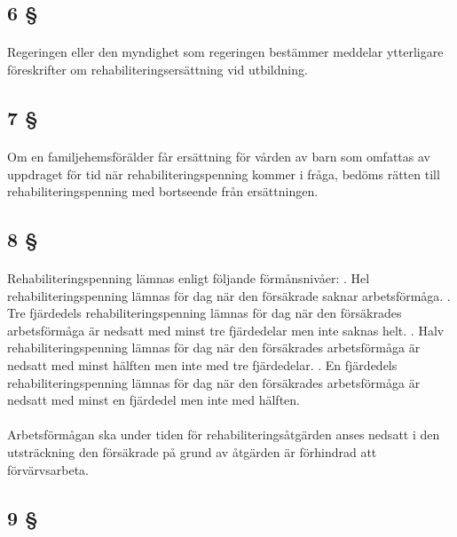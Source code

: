 \documentclass[a4paper,notitlepage,openany,10pt]{book}
\begin{document}
\subsection*{6 §}
\paragraph*{}
Regeringen eller den myndighet som regeringen bestämmer meddelar ytterligare föreskrifter om rehabiliteringsersättning vid utbildning.
\subsection*{7 §}
\paragraph*{}
Om en familjehemsförälder får ersättning för vården av barn som omfattas av uppdraget för tid när rehabiliteringspenning kommer i fråga, bedöms rätten till rehabiliteringspenning med bortseende från ersättningen.
\subsection*{8 §}
\paragraph*{}
Rehabiliteringspenning lämnas enligt följande förmånsnivåer:
. Hel rehabiliteringspenning lämnas för dag när den försäkrade saknar arbetsförmåga.
. Tre fjärdedels rehabiliteringspenning lämnas för dag när den försäkrades arbetsförmåga är nedsatt med minst tre fjärdedelar men inte saknas helt.
. Halv rehabiliteringspenning lämnas för dag när den försäkrades arbetsförmåga är nedsatt med minst hälften men inte med tre fjärdedelar.
. En fjärdedels rehabiliteringspenning lämnas för dag när den försäkrades arbetsförmåga är nedsatt med minst en fjärdedel men inte med hälften.
\paragraph*{}
Arbetsförmågan ska under tiden för rehabiliteringsåtgärden anses nedsatt i den utsträckning den försäkrade på grund av åtgärden är förhindrad att förvärvsarbeta.
\subsection*{9 §}
\end{document}
